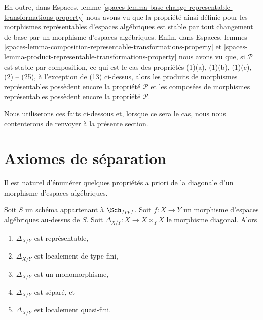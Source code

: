 \medskip\noindent
En outre, dans
Espaces, lemme
\ref{spaces-lemma-base-change-representable-transformations-property}
nous avons vu que la propriété
ainsi définie pour les morphismes représentables d'espaces algébriques est stable par
tout changement de base par un morphisme d'espaces algébriques.
Enfin, dans
Espaces, lemmes
\ref{spaces-lemma-composition-representable-transformations-property} et
\ref{spaces-lemma-product-representable-transformations-property}
nous avons vu que, si $\mathcal{P}$ est stable par composition,
ce qui est le cas des propriétés
(1)(a), (1)(b), (1)(c), (2) -- (25), à l'exception de (13) ci-dessus, alors
les produits de morphismes représentables possèdent encore la propriété $\mathcal{P}$
et les composées de morphismes représentables possèdent encore la propriété $\mathcal{P}$.

\medskip\noindent
Nous utiliserons ces faits ci-dessous et, lorsque ce sera le cas, nous nous contenterons
de renvoyer à la présente section.















\section{Axiomes de séparation}
\label{section-separation-axioms}

\noindent
Il est naturel d'énumérer quelques propriétés a priori de la diagonale
d'un morphisme d'espaces algébriques.

\begin{lemma}
\label{lemma-properties-diagonal}
Soit $S$ un schéma appartenant à $\Sch_{fppf}$.
Soit $f : X \to Y$ un morphisme d'espaces algébriques au-dessus de $S$.
Soit $\Delta_{X/Y} : X \to X \times_Y X$ le morphisme diagonal.
Alors
\begin{enumerate}
\item $\Delta_{X/Y}$ est représentable,
\item $\Delta_{X/Y}$ est localement de type fini,
\item $\Delta_{X/Y}$ est un monomorphisme,
\item $\Delta_{X/Y}$ est séparé, et
\item $\Delta_{X/Y}$ est localement quasi-fini.
\end{enumerate}
\end{lemma}

